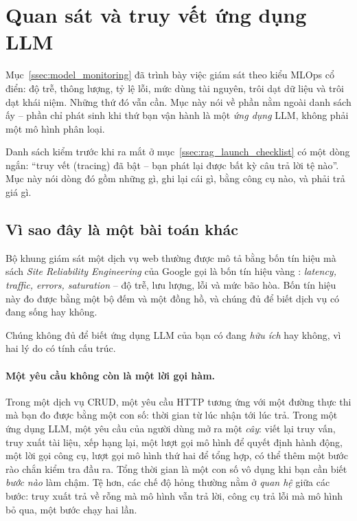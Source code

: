 
\section{Quan sát và truy vết ứng dụng LLM}
\label{sec:llm_observability}

Mục~\ref{ssec:model_monitoring} đã trình bày việc giám sát theo kiểu MLOps cổ điển: độ trễ, thông lượng, tỷ lệ lỗi, mức dùng tài nguyên, trôi dạt dữ liệu và trôi dạt khái niệm. Những thứ đó vẫn cần. Mục này nói về phần nằm ngoài danh sách ấy -- phần chỉ phát sinh khi thứ bạn vận hành là một \emph{ứng dụng} LLM, không phải một mô hình phân loại.

Danh sách kiểm trước khi ra mắt ở mục~\ref{ssec:rag_launch_checklist} có một dòng ngắn: ``truy vết (tracing) đã bật -- bạn phát lại được bất kỳ câu trả lời tệ nào''. Mục này nói dòng đó gồm những gì, ghi lại cái gì, bằng công cụ nào, và phải trả giá gì.

\subsection{Vì sao đây là một bài toán khác}
\label{ssec:why_llm_obs}

Bộ khung giám sát một dịch vụ web thường được mô tả bằng bốn tín hiệu mà sách \textit{Site Reliability Engineering} của Google gọi là bốn tín hiệu vàng \cite{beyer2016sre}: \emph{latency, traffic, errors, saturation} -- độ trễ, lưu lượng, lỗi và mức bão hòa. Bốn tín hiệu này đo được bằng một bộ đếm và một đồng hồ, và chúng đủ để biết dịch vụ có đang sống hay không.

Chúng không đủ để biết ứng dụng LLM của bạn có đang \emph{hữu ích} hay không, vì hai lý do có tính cấu trúc.

\paragraph{Một yêu cầu không còn là một lời gọi hàm.} Trong một dịch vụ CRUD, một yêu cầu HTTP tương ứng với một đường thực thi mà bạn đo được bằng một con số: thời gian từ lúc nhận tới lúc trả. Trong một ứng dụng LLM, một yêu cầu của người dùng mở ra một \emph{cây}: viết lại truy vấn, truy xuất tài liệu, xếp hạng lại, một lượt gọi mô hình để quyết định hành động, một lời gọi công cụ, lượt gọi mô hình thứ hai để tổng hợp, có thể thêm một bước rào chắn kiểm tra đầu ra. Tổng thời gian là một con số vô dụng khi bạn cần biết \emph{bước nào} làm chậm. Tệ hơn, các chế độ hỏng thường nằm ở \emph{quan hệ} giữa các bước: truy xuất trả về rỗng mà mô hình vẫn trả lời, công cụ trả lỗi mà mô hình bỏ qua, một bước chạy hai lần.

